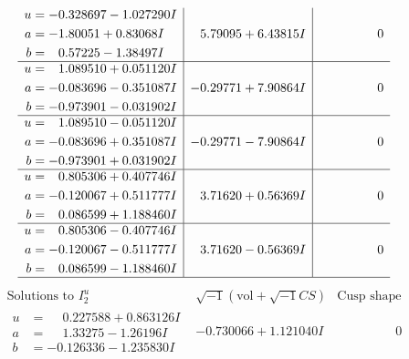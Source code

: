 \documentclass[1p]{elsarticle_modified}
\theoremstyle{definition}
\newcommand{\I}{\sqrt{-1}}
\begin{document}
$$\begin{array}{c|c|c}
\begin{aligned}
u &= -0.328697 - 1.027290 I \\
a &= -1.80051 + 0.83068 I \\
b &= \phantom{-}0.57225 - 1.38497 I\end{aligned}
 & \phantom{-}5.79095 + 6.43815 I & \phantom{-0.000000 } 0 \\ \hline\begin{aligned}
u &= \phantom{-}1.089510 + 0.051120 I \\
a &= -0.083696 - 0.351087 I \\
b &= -0.973901 - 0.031902 I\end{aligned}
 & -0.29771 + 7.90864 I & \phantom{-0.000000 } 0 \\ \hline\begin{aligned}
u &= \phantom{-}1.089510 - 0.051120 I \\
a &= -0.083696 + 0.351087 I \\
b &= -0.973901 + 0.031902 I\end{aligned}
 & -0.29771 - 7.90864 I & \phantom{-0.000000 } 0 \\ \hline\begin{aligned}
u &= \phantom{-}0.805306 + 0.407746 I \\
a &= -0.120067 + 0.511777 I \\
b &= \phantom{-}0.086599 + 1.188460 I\end{aligned}
 & \phantom{-}3.71620 + 0.56369 I & \phantom{-0.000000 } 0 \\ \hline\begin{aligned}
u &= \phantom{-}0.805306 - 0.407746 I \\
a &= -0.120067 - 0.511777 I \\
b &= \phantom{-}0.086599 - 1.188460 I\end{aligned}
 & \phantom{-}3.71620 - 0.56369 I & \phantom{-0.000000 } 0\\
 \hline 
 \end{array}$$\newpage$$\begin{array}{c|c|c}  
\text{Solutions to }I^u_{2}& \I (\text{vol} + \sqrt{-1}CS) & \text{Cusp shape}\\
 \hline 
\begin{aligned}
u &= \phantom{-}0.227588 + 0.863126 I \\
a &= \phantom{-}1.33275 - 1.26196 I \\
b &= -0.126336 - 1.235830 I\end{aligned}
 & -0.730066 + 1.121040 I & \phantom{-0.000000 } 0 \\ \hline\begin{aligned}

\end{aligned}
\end{array}$$
\end{document}
